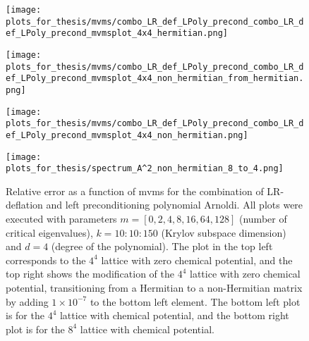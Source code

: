 \begin{figure}[H]
    \centering
    \begin{minipage}{0.45\textwidth}
        \centering
        \texttt{[image: plots\_for\_thesis/mvms/combo\_LR\_def\_LPoly\_precond\_combo\_LR\_def\_LPoly\_precond\_mvmsplot\_4x4\_hermitian.png]} %
    \end{minipage}%
    \hspace{0.02\textwidth} %
    \begin{minipage}{0.45\textwidth}
        \centering
        \texttt{[image: plots\_for\_thesis/mvms/combo\_LR\_def\_LPoly\_precond\_combo\_LR\_def\_LPoly\_precond\_mvmsplot\_4x4\_non\_hermitian\_from\_hermitian.png]} %
    \end{minipage}
    
    \vspace{0.02\textwidth} %
    
    \begin{minipage}{0.45\textwidth}
        \centering
        \texttt{[image: plots\_for\_thesis/mvms/combo\_LR\_def\_LPoly\_precond\_combo\_LR\_def\_LPoly\_precond\_mvmsplot\_4x4\_non\_hermitian.png]} %
    \end{minipage}%
    \hspace{0.02\textwidth} %
    \begin{minipage}{0.45\textwidth}
        \centering
        \texttt{[image: plots\_for\_thesis/spectrum\_A^2\_non\_hermitian\_8\_to\_4.png]} %
    \end{minipage}
    
    \caption{\small Relative error as a function of mvms for the combination of LR-deflation and left preconditioning polynomial Arnoldi. All plots were executed with parameters $m = [0, 2, 4, 8, 16, 64, 128]$ (number of critical eigenvalues), $k = 10:10:150$ (Krylov subspace dimension) and $d = 4$ (degree of the polynomial). The plot in the top left corresponds to the $4^4$ lattice with zero chemical potential, and the top right shows the modification of the $4^4$ lattice with zero chemical potential, transitioning from a Hermitian to a non-Hermitian matrix by adding $1 \times 10^{-7}$ to the bottom left element. The bottom left plot is for the $4^4$ lattice with chemical potential, and the bottom right plot is for the $8^4$ lattice with chemical potential.}
    \label{fig:combo_LR+left_pre_cond_mvms_plot}
\end{figure}

